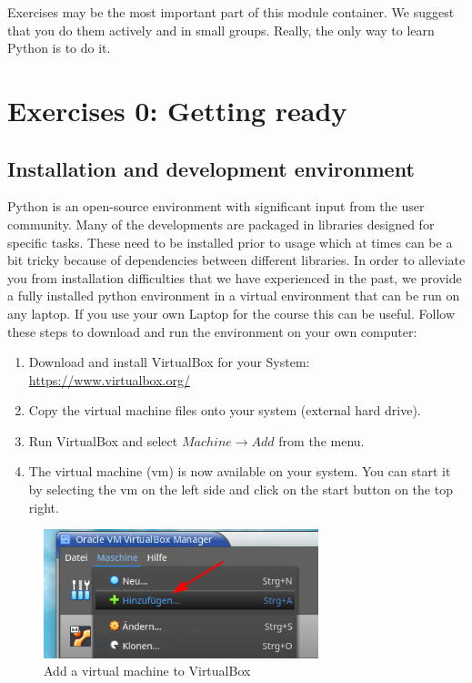 \begin{tcolorbox}[enhanced jigsaw,breakable,pad at break*=1mm,
    colback=blue!5!white,colframe=babyblueeyes,title=Exercises]
    Exercises may be the most important part of this module container.
    We suggest that you do them actively and in small groups. Really, the only way to learn Python is to do it.      
\end{tcolorbox}
\section{Exercises 0: Getting ready}

\subsection{Installation and development environment}
Python is an open-source environment with significant input from the user community.
Many of the developments are packaged in libraries designed for specific tasks.
These need to be installed prior to usage which at times can be a bit tricky because of dependencies between
different libraries. In order to alleviate you from installation difficulties that we have experienced in
the past, we provide a fully installed python environment in a virtual environment that can be run on any laptop.
If you use your own Laptop for the course this can be useful. Follow these steps to download and run the environment on your own computer:\\

\begin{enumerate}
    \item Download and install VirtualBox for your System: \url{https://www.virtualbox.org/}
    \item Copy the virtual machine files onto your system (external hard drive).
    \item Run VirtualBox and select $Machine \rightarrow Add$ from the menu.
    \item The virtual machine (vm) is now available on your system. You can start it by selecting the vm on the left side and click on the start button on the top right.
\end{enumerate}

\begin{figure}[h!]
    \centering
    \includegraphics[width=8cm]{Figures/virtual_box1.png}
    \caption{Add a virtual machine to VirtualBox}
\end{figure}

